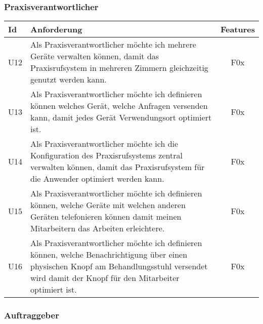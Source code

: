 \clearpage

\subsubsection*{Praxisverantwortlicher}

\begin{table}[h]
    \centering
    \begin{tabular}{|l|p{13cm}|c|}
        \hline
        \textbf{Id} & \textbf{Anforderung}                                                                                                                                                                               & \textbf{Features} \\
        \hline
        U12         & Als Praxisverantwortlicher möchte ich mehrere Geräte verwalten können, damit das Praxisrufsystem in mehreren Zimmern gleichzeitig genutzt werden kann. & F0x \\
        \hline
        U13         & Als Praxisverantwortlicher möchte ich definieren können welches Gerät, welche Anfragen versenden kann, damit jedes Gerät Verwendungsort optimiert ist. & F0x \\
        \hline
        U14         & Als Praxisverantwortlicher möchte ich die Konfiguration des Praxisrufsystems zentral verwalten können, damit das Praxisrufsystem für die Anwender optimiert werden kann. & F0x \\
        \hline
        U15         & Als Praxisverantwortlicher möchte ich definieren können, welche Geräte mit welchen anderen Geräten telefonieren können damit meinen Mitarbeitern das Arbeiten erleichtere. & F0x \\
        \hline
        U16         & Als Praxisverantwortlicher möchte ich definieren können, welche Benachrichtigung über einen physischen Knopf am Behandlungsstuhl versendet wird damit der Knopf für den Mitarbeiter optimiert ist. & F0x \\
        \hline
    \end{tabular}\label{tab:userstories2}
\end{table}

\subsubsection*{Auftraggeber}\label{subsec:auftraggeber}

